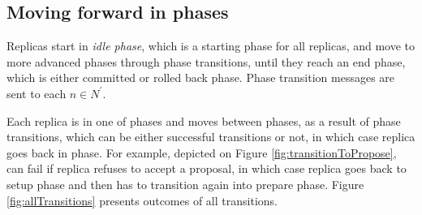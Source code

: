 

















\subsection{Moving forward in phases}
Replicas start in \emph{idle phase}, which is a starting phase for all replicas, and move to more advanced phases through phase transitions, until they reach an end phase, which is either committed or rolled back phase. Phase transition messages are sent to each $n\in \mathit{N}^'$.

Each replica is in one of phases and moves between phases, as a result of phase transitions, which can be either successful transitions or not, in which case replica goes back in phase. 
For example, \proposeTransition depicted on Figure \ref{fig:transitionToPropose}, can fail if replica refuses to accept a proposal, in which case replica goes back to setup phase and then has to transition again into prepare phase. Figure \ref{fig:allTransitions} presents outcomes of all transitions.



